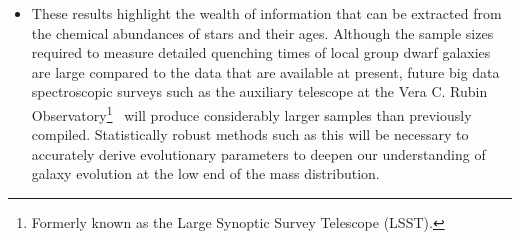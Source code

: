 \documentclass[ms.tex]{subfiles}
\begin{document}
\begin{itemize}
	\item These results highlight the wealth of information that can be
	extracted from the chemical abundances of stars and their ages.
	Although the sample sizes required to measure detailed quenching times of
	local group dwarf galaxies are large compared to the data that are
	available at present, future big data spectroscopic surveys such as the
	auxiliary telescope at the Vera C. Rubin Observatory\footnote{
		Formerly known as the Large Synoptic Survey Telescope (LSST).
	}~\citep{Ivezic2019} will produce considerably larger samples than
	previously compiled.
	Statistically robust methods such as this will be necessary to accurately
	derive evolutionary parameters to deepen our understanding of galaxy
	evolution at the low end of the mass distribution.

\end{itemize}
\end{document}
